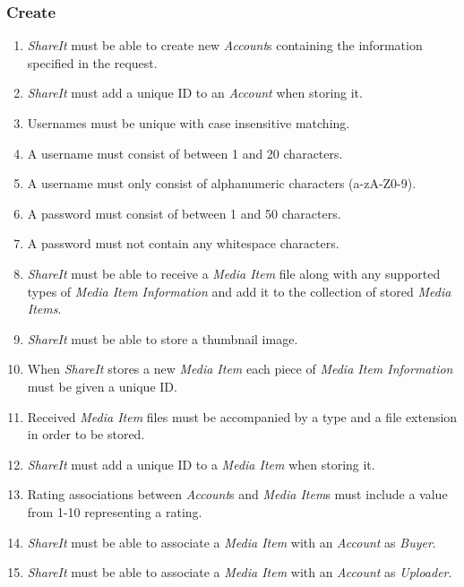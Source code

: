 \documentclass[../report.tex]{subfiles}
\begin{document}
\subsubsection{Create}
\begin{enumerate}[label=\textbf{FR-\twodigits*},resume]

\item \textit{ShareIt} must be able to create new \textit{Account}s containing the information specified in the request.

\item \textit{ShareIt} must add a unique ID to an \textit{Account} when storing it.

\item Usernames must be unique with case insensitive matching.

\item A username must consist of between 1 and 20 characters.

\item A username must only consist of alphanumeric characters (a-zA-Z0-9).

\item A password must consist of between 1 and 50 characters. 

\item A password must not contain any whitespace characters.

\item \textit{ShareIt} must be able to receive a \textit{Media Item} file along with any supported types of \textit{Media Item Information} and add it to the collection of stored \textit{Media Items}.

\item \textit{ShareIt} must be able to store a thumbnail image.

\item When \textit{ShareIt} stores a new \textit{Media Item} each piece of \textit{Media Item Information} must be given a unique ID.

\item Received \textit{Media Item} files must be accompanied by a type and a file extension in order to be stored.

\item \textit{ShareIt} must add a unique ID to a \textit{Media Item} when storing it.

\item Rating associations between \textit{Account}s and \textit{Media Item}s must include a value from 1-10 representing a rating.

\item \textit{ShareIt} must be able to associate a \textit{Media Item} with an \textit{Account} as \textit{Buyer}.

\item \textit{ShareIt} must be able to associate a \textit{Media Item} with an \textit{Account} as \textit{Uploader}.
\end{enumerate}
\end{document}
